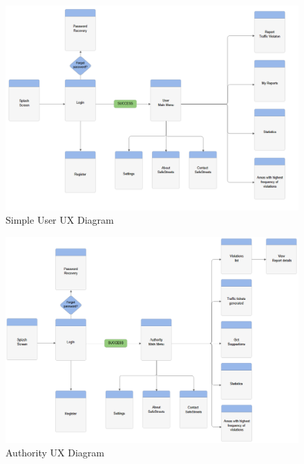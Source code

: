  \begin{figure}[H]
          \includegraphics[width=1.25\textwidth,left]{Images/ux_diagram_user2.png}
        \caption{Simple User UX Diagram}
    \end{figure}
     \begin{figure}[H]
          \includegraphics[width=1.25\textwidth,left]{Images/ux_diagram_auth2.png}
        \caption{Authority UX Diagram}
    \end{figure}
    
   